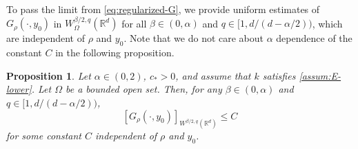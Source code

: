 \documentclass[reqno]{amsart}
\theoremstyle{plain}
\newtheorem{proposition}[theorem]{Proposition}
\theoremstyle{definition}
\numberwithin{equation}{section}
\newcommand{\Rd}{\mathbb{R}^d}
\newcommand{\cl} {c_{\ast}}
\begin{document}
To pass the limit from \eqref{eq:regularized-G}, we provide uniform estimates of $G_\rho(\cdot, y_0)$ in $W^{\beta/2, q}_\Omega(\Rd)$
for all $\beta \in (0, \alpha)$ and $q \in [1, d/(d-\alpha/2))$, which are independent of $\rho$ and $y_0$. Note that we do not care about $\alpha$ dependence of the constant $C$ in the following proposition.

\begin{proposition} \label{prop:uniform_estimates}
Let $\alpha \in (0, 2)$, $\cl > 0$, and assume that $k$ satisfies \eqref{assum:E-lower}. Let $\Omega$ be a bounded open set. Then, for any $\beta \in (0,\alpha)$ and $q \in [1, d/(d-\alpha/2))$,
\begin{equation} \label{eq:seminorm-bq}
[G_\rho(\cdot, y_0)]_{W^{\beta/2, q}(\Rd)} \leq C
\end{equation}
for some constant $C$ independent of $\rho$ and $y_0$.
\end{proposition}
\end{document}
